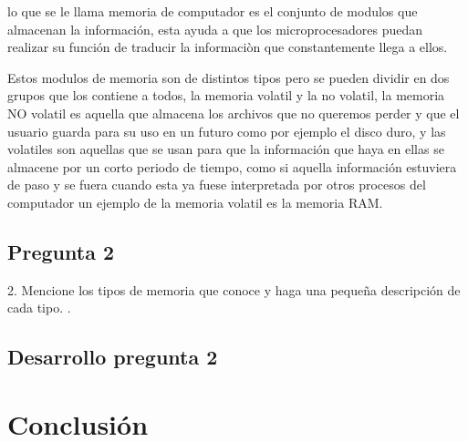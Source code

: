 \documentclass{article}
\begin{document}
lo que se le llama memoria de computador 
es el conjunto de modulos que almacenan 
la información, esta ayuda a que los microprocesadores puedan realizar su función de traducir la informaciòn que constantemente llega a ellos.

\vspace{0.3cm}
Estos modulos de memoria son de distintos tipos pero se pueden dividir en dos grupos que los contiene a todos, la memoria volatil y la no volatil, la memoria NO volatil es aquella que almacena los archivos que no queremos perder y que el usuario guarda para su uso en un futuro como por ejemplo el disco duro, y las volatiles son aquellas que se usan para que la información que haya en ellas se almacene por un corto periodo de tiempo, como si aquella información estuviera de paso y se fuera cuando esta ya fuese interpretada por otros procesos del computador un ejemplo de la memoria volatil es la memoria RAM.


\subsection{Pregunta 2}
2. Mencione los tipos de memoria que conoce y haga una pequeña descripción de cada tipo.
. \cite{refer}
\subsection{Desarrollo pregunta 2}



\section{Conclusión} \label{conclulsion}



\end{document}
